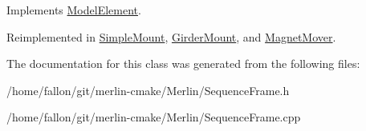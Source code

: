 Implements \hyperlink{classModelElement_a04dc2e51e1999fca612eb1838ec6b271}{Model\+Element}.



Reimplemented in \hyperlink{classSimpleMount_afc88ec17aa2aea7f526bb7f52913f96a}{Simple\+Mount}, \hyperlink{classGirderMount_af23acf9dc5a5aa1bf3eb246fd6fcbca1}{Girder\+Mount}, and \hyperlink{classMagnetMover_a01e7a7b50824532e141fa18ba58c2758}{Magnet\+Mover}.



The documentation for this class was generated from the following files\+:\begin{DoxyCompactItemize}
\item 
/home/fallon/git/merlin-\/cmake/\+Merlin/Sequence\+Frame.\+h\item 
/home/fallon/git/merlin-\/cmake/\+Merlin/Sequence\+Frame.\+cpp\end{DoxyCompactItemize}
